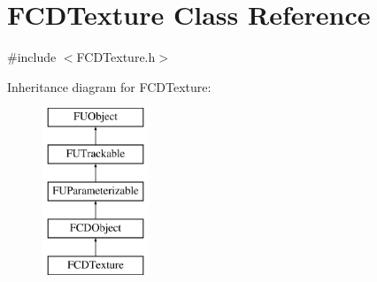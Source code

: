 \hypertarget{classFCDTexture}{
\section{FCDTexture Class Reference}
\label{classFCDTexture}
}


{\ttfamily \#include $<$FCDTexture.h$>$}

Inheritance diagram for FCDTexture:\begin{figure}[H]
\begin{center}
\leavevmode
\includegraphics[height=5.000000cm]{classFCDTexture}
\end{center}
\end{figure}
